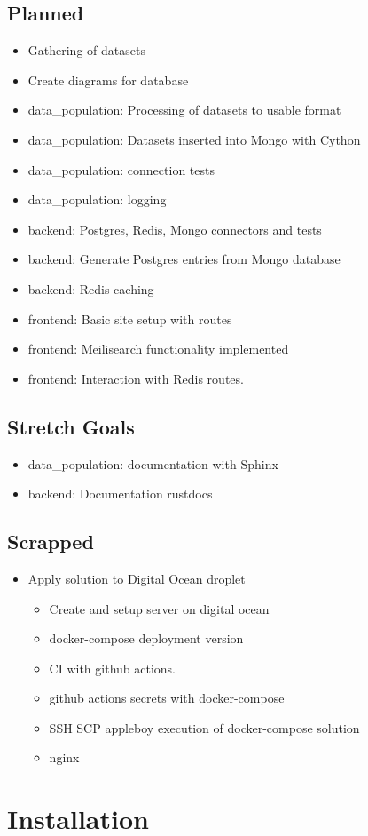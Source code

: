 \documentclass[a4paper, 12pt]{article}
\begin{document}
\subsection{Planned}
\begin{itemize}
	\item Gathering of datasets
	\item Create diagrams for database
	\item data\_population: Processing of datasets to usable format
	\item data\_population: Datasets inserted into Mongo with Cython
	\item data\_population: connection tests
	\item data\_population: logging
	\item backend: Postgres, Redis, Mongo connectors and tests
	\item backend: Generate Postgres entries from Mongo database
	\item backend: Redis caching
	\item frontend: Basic site setup with routes
	\item frontend: Meilisearch functionality implemented
	\item frontend: Interaction with Redis routes.
\end{itemize}

\subsection{Stretch Goals}
\begin{itemize}
	\item data\_population: documentation with Sphinx
	\item backend: Documentation rustdocs 
	
\end{itemize}

\subsection{Scrapped}
\begin{itemize}
	\item Apply solution to Digital Ocean droplet
	\begin{itemize}
		\item Create and setup server on digital ocean
		\item docker-compose deployment version
		\item CI with github actions.
		\item github actions secrets with docker-compose
		\item SSH SCP appleboy execution of docker-compose solution
		\item nginx
	\end{itemize}

\end{itemize}

\section{Installation}
\end{document}
